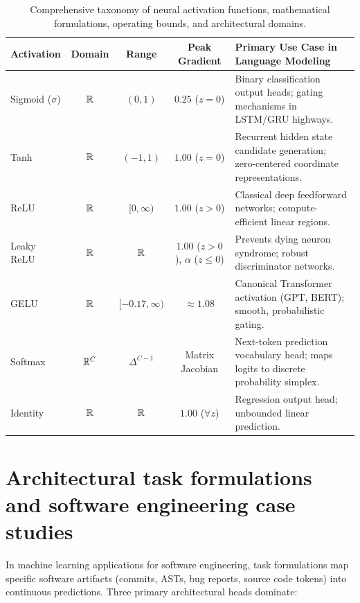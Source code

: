\documentclass[../../main.tex]{subfiles}
\begin{document}
\begin{table}[htbp]
\centering
\small
\caption{Comprehensive taxonomy of neural activation functions, mathematical formulations, operating bounds, and architectural domains.}
\label{tab:activations_taxonomy}
\begin{tabularx}{\textwidth}{l c c c >{\raggedright\arraybackslash}X}
\toprule
\textbf{Activation} & \textbf{Domain} & \textbf{Range} & \textbf{Peak Gradient} & \textbf{Primary Use Case in Language Modeling} \\
\midrule
Sigmoid ($\sigma$) & $\mathbb{R}$ & $(0, 1)$ & $0.25$ ($z=0$) & Binary classification output heads; gating mechanisms in LSTM/GRU highways. \\
Tanh & $\mathbb{R}$ & $(-1, 1)$ & $1.00$ ($z=0$) & Recurrent hidden state candidate generation; zero-centered coordinate representations. \\
ReLU & $\mathbb{R}$ & $[0, \infty)$ & $1.00$ ($z > 0$) & Classical deep feedforward networks; compute-efficient linear regions. \\
Leaky ReLU & $\mathbb{R}$ & $\mathbb{R}$ & $1.00$ ($z > 0$), $\alpha$ ($z \le 0$) & Prevents dying neuron syndrome; robust discriminator networks. \\
GELU & $\mathbb{R}$ & $[-0.17, \infty)$ & $\approx 1.08$ & Canonical Transformer activation (GPT, BERT); smooth, probabilistic gating. \\
Softmax & $\mathbb{R}^C$ & $\Delta^{C-1}$ & Matrix Jacobian & Next-token prediction vocabulary head; maps logits to discrete probability simplex. \\
Identity & $\mathbb{R}$ & $\mathbb{R}$ & $1.00$ ($\forall z$) & Regression output head; unbounded linear prediction. \\
\bottomrule
\end{tabularx}
\end{table}


\clearpage
\section{Architectural task formulations and software engineering case studies}
\label{sec:task_formulations_se}

In machine learning applications for software engineering, task formulations map specific software artifacts (commits, ASTs, bug reports, source code tokens) into continuous predictions. Three primary architectural heads dominate:
\end{document}
